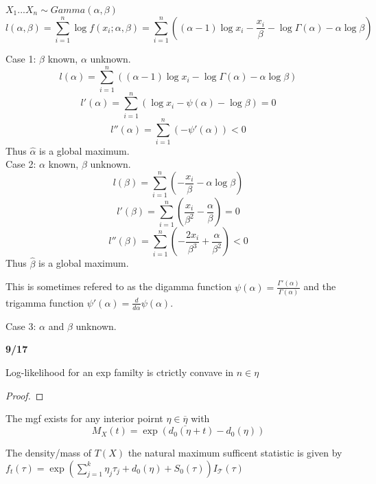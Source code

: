 \documentclass[answers,12pt,addpoints]{exam}
\begin{document}
\begin{example}
    $X_1 ... X_n \sim Gamma(\alpha, \beta)$ 
    $$l(\alpha, \beta) = \sum_{i=1}^{n} \log f(x_i; \alpha, \beta) = \sum_{i=1}^{n} \left( (\alpha-1)\log x_i - \frac{x_i}{\beta} - \log \Gamma(\alpha) - \alpha \log \beta \right)$$

    Case 1: $\beta$ known, $\alpha$ unknown.\\
    $$l(\alpha) = \sum_{i=1}^{n} \left( (\alpha-1)\log x_i - \log \Gamma(\alpha) - \alpha \log \beta \right)$$
    $$l'(\alpha) = \sum_{i=1}^{n} \left( \log x_i - \psi(\alpha) - \log \beta \right) = 0$$
    $$l''(\alpha) = \sum_{i=1}^{n} \left( -\psi'(\alpha) \right) < 0$$
    Thus $\hat{\alpha}$ is a global maximum.\\
    Case 2: $\alpha$ known, $\beta$ unknown.\\
    $$l(\beta) = \sum_{i=1}^{n} \left( -\frac{x_i}{\beta} - \alpha \log \beta \right)$$
    $$l'(\beta) = \sum_{i=1}^{n} \left  ( \frac{x_i}{\beta^2} - \frac{\alpha}{\beta} \right) = 0$$
    $$l''(\beta) = \sum_{i=1}^{n} \left( -\frac{2x_i}{\beta^3} + \frac{\alpha}{\beta^2} \right) < 0$$
    Thus $\hat{\beta}$ is a global maximum.

    This is sometimes refered to as the digamma function $\psi(\alpha) = \frac{\Gamma'(\alpha)}{\Gamma(\alpha)}$ and the trigamma function $\psi'(\alpha) = \frac{d}{d\alpha} \psi(\alpha)$.

    Case 3: $\alpha$ and $\beta$ unknown.\\
\end{example}

\textbf{9/17}
\begin{theorem}
    Log-likelihood for an exp familty is ctrictly convave in $n \in \eta$ 
    \begin{proof}
        
    \end{proof}
\end{theorem}

\begin{lemma}
    [4.1] The mgf exists for any interior poirnt $\eta \in \underline {\overline{\eta}}$ with $$M_X(t) = \exp\left( d_0(\eta+t) - d_0(\eta) \right)$$
\end{lemma}
\begin{lemma}
    [4.2] The density/mass of $T(X)$ the natural maximum sufficent statistic is given by $f_t(\tau) = \exp\left( \sum_{j=1}^{k} \eta_j \tau_j + d_0(\eta) + S_0(\tau) \right) I_{\mathcal{T}}(\tau)$
\end{lemma}
\end{document}
